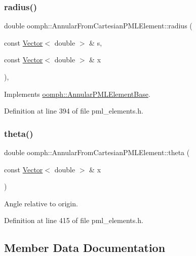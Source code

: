 \subsubsection{\texorpdfstring{radius()}{radius()}}
{\footnotesize\ttfamily double oomph\+::\+Annular\+From\+Cartesian\+P\+M\+L\+Element\+::radius (\begin{DoxyParamCaption}\item[{const \hyperlink{classoomph_1_1Vector}{Vector}$<$ double $>$ \&}]{s,  }\item[{const \hyperlink{classoomph_1_1Vector}{Vector}$<$ double $>$ \&}]{x }\end{DoxyParamCaption})\hspace{0.3cm}{\ttfamily [inline]}, {\ttfamily [virtual]}}



Implements \hyperlink{classoomph_1_1AnnularPMLElementBase_a5d3de2d99d848942e6fb533fd9cf58da}{oomph\+::\+Annular\+P\+M\+L\+Element\+Base}.



Definition at line 394 of file pml\+\_\+elements.\+h.

\mbox{\label{classoomph_1_1AnnularFromCartesianPMLElement_a7c681a8ec4f83f5e9989a8d2fee4de91}} 
\subsubsection{\texorpdfstring{theta()}{theta()}}
{\footnotesize\ttfamily double oomph\+::\+Annular\+From\+Cartesian\+P\+M\+L\+Element\+::theta (\begin{DoxyParamCaption}\item[{const \hyperlink{classoomph_1_1Vector}{Vector}$<$ double $>$ \&}]{x }\end{DoxyParamCaption})\hspace{0.3cm}{\ttfamily [inline]}}



Angle relative to origin. 



Definition at line 415 of file pml\+\_\+elements.\+h.



\subsection{Member Data Documentation}
\mbox{\label{classoomph_1_1AnnularFromCartesianPMLElement_aa31e399eca5049053bce373144a52de0}} 
